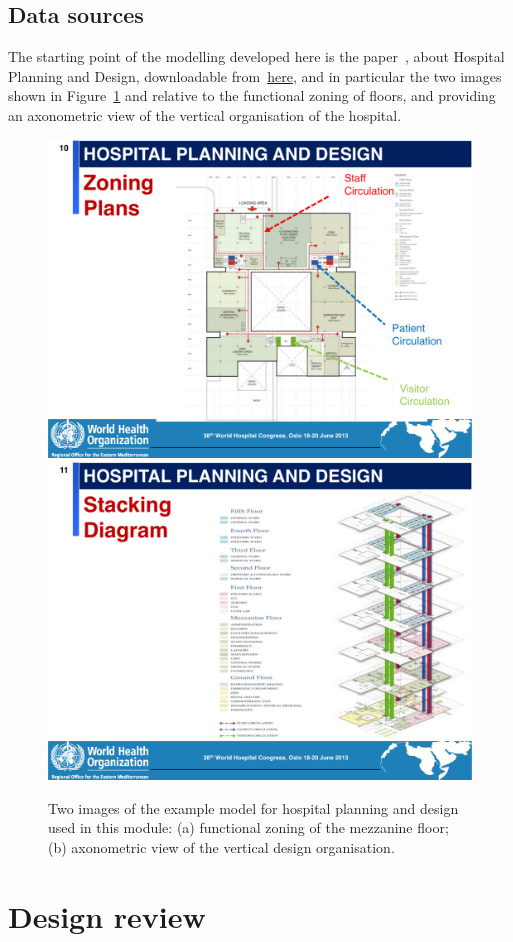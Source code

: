 \documentclass[11pt,oneside]{article}    %
\begin{document}
\subsection{Data sources}

The starting point of the modelling developed here is the paper~\cite{who:2013}, about Hospital Planning and Design, downloadable from~\href{http://paoluzzi.dia.uniroma3.it/web/hospital-planning-and-design.pdf}{here}, and in particular the two images shown in Figure~\ref{fig:hismail} and relative to the functional zoning of floors, and providing an axonometric view of the vertical organisation of the hospital.

\begin{figure}[htbp] %
   \centering
   \includegraphics[width=0.495\linewidth]{images/hismail-1} 
   \includegraphics[width=0.495\linewidth]{images/hismail-2} 
   \caption{Two images of the example model for hospital planning and design used in this module: (a) functional zoning of the mezzanine floor; (b) axonometric view of the vertical design organisation.}
   \label{fig:hismail}
\end{figure}



\section{Design review}
\end{document}
